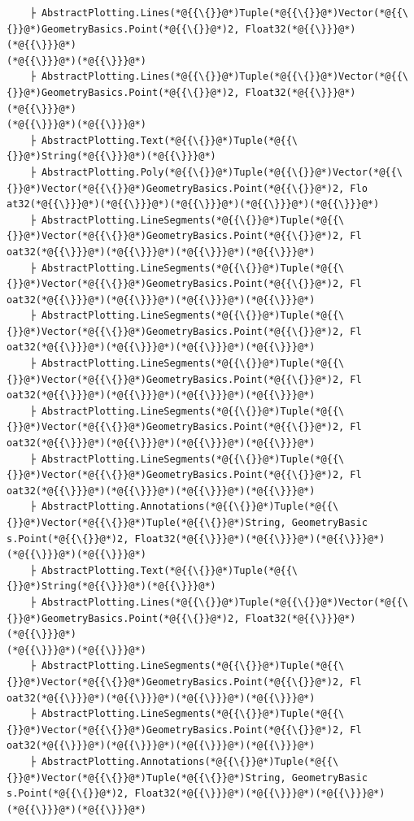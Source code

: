 \documentclass[12pt,a4paper]{article}
\begin{document}
\begin{lstlisting}
    ├ AbstractPlotting.Lines(*@{{\{}}@*)Tuple(*@{{\{}}@*)Vector(*@{{\{}}@*)GeometryBasics.Point(*@{{\{}}@*)2, Float32(*@{{\}}}@*)(*@{{\}}}@*)
(*@{{\}}}@*)(*@{{\}}}@*)
    ├ AbstractPlotting.Lines(*@{{\{}}@*)Tuple(*@{{\{}}@*)Vector(*@{{\{}}@*)GeometryBasics.Point(*@{{\{}}@*)2, Float32(*@{{\}}}@*)(*@{{\}}}@*)
(*@{{\}}}@*)(*@{{\}}}@*)
    ├ AbstractPlotting.Text(*@{{\{}}@*)Tuple(*@{{\{}}@*)String(*@{{\}}}@*)(*@{{\}}}@*)
    ├ AbstractPlotting.Poly(*@{{\{}}@*)Tuple(*@{{\{}}@*)Vector(*@{{\{}}@*)Vector(*@{{\{}}@*)GeometryBasics.Point(*@{{\{}}@*)2, Flo
at32(*@{{\}}}@*)(*@{{\}}}@*)(*@{{\}}}@*)(*@{{\}}}@*)(*@{{\}}}@*)
    ├ AbstractPlotting.LineSegments(*@{{\{}}@*)Tuple(*@{{\{}}@*)Vector(*@{{\{}}@*)GeometryBasics.Point(*@{{\{}}@*)2, Fl
oat32(*@{{\}}}@*)(*@{{\}}}@*)(*@{{\}}}@*)(*@{{\}}}@*)
    ├ AbstractPlotting.LineSegments(*@{{\{}}@*)Tuple(*@{{\{}}@*)Vector(*@{{\{}}@*)GeometryBasics.Point(*@{{\{}}@*)2, Fl
oat32(*@{{\}}}@*)(*@{{\}}}@*)(*@{{\}}}@*)(*@{{\}}}@*)
    ├ AbstractPlotting.LineSegments(*@{{\{}}@*)Tuple(*@{{\{}}@*)Vector(*@{{\{}}@*)GeometryBasics.Point(*@{{\{}}@*)2, Fl
oat32(*@{{\}}}@*)(*@{{\}}}@*)(*@{{\}}}@*)(*@{{\}}}@*)
    ├ AbstractPlotting.LineSegments(*@{{\{}}@*)Tuple(*@{{\{}}@*)Vector(*@{{\{}}@*)GeometryBasics.Point(*@{{\{}}@*)2, Fl
oat32(*@{{\}}}@*)(*@{{\}}}@*)(*@{{\}}}@*)(*@{{\}}}@*)
    ├ AbstractPlotting.LineSegments(*@{{\{}}@*)Tuple(*@{{\{}}@*)Vector(*@{{\{}}@*)GeometryBasics.Point(*@{{\{}}@*)2, Fl
oat32(*@{{\}}}@*)(*@{{\}}}@*)(*@{{\}}}@*)(*@{{\}}}@*)
    ├ AbstractPlotting.LineSegments(*@{{\{}}@*)Tuple(*@{{\{}}@*)Vector(*@{{\{}}@*)GeometryBasics.Point(*@{{\{}}@*)2, Fl
oat32(*@{{\}}}@*)(*@{{\}}}@*)(*@{{\}}}@*)(*@{{\}}}@*)
    ├ AbstractPlotting.Annotations(*@{{\{}}@*)Tuple(*@{{\{}}@*)Vector(*@{{\{}}@*)Tuple(*@{{\{}}@*)String, GeometryBasic
s.Point(*@{{\{}}@*)2, Float32(*@{{\}}}@*)(*@{{\}}}@*)(*@{{\}}}@*)(*@{{\}}}@*)(*@{{\}}}@*)
    ├ AbstractPlotting.Text(*@{{\{}}@*)Tuple(*@{{\{}}@*)String(*@{{\}}}@*)(*@{{\}}}@*)
    ├ AbstractPlotting.Lines(*@{{\{}}@*)Tuple(*@{{\{}}@*)Vector(*@{{\{}}@*)GeometryBasics.Point(*@{{\{}}@*)2, Float32(*@{{\}}}@*)(*@{{\}}}@*)
(*@{{\}}}@*)(*@{{\}}}@*)
    ├ AbstractPlotting.LineSegments(*@{{\{}}@*)Tuple(*@{{\{}}@*)Vector(*@{{\{}}@*)GeometryBasics.Point(*@{{\{}}@*)2, Fl
oat32(*@{{\}}}@*)(*@{{\}}}@*)(*@{{\}}}@*)(*@{{\}}}@*)
    ├ AbstractPlotting.LineSegments(*@{{\{}}@*)Tuple(*@{{\{}}@*)Vector(*@{{\{}}@*)GeometryBasics.Point(*@{{\{}}@*)2, Fl
oat32(*@{{\}}}@*)(*@{{\}}}@*)(*@{{\}}}@*)(*@{{\}}}@*)
    ├ AbstractPlotting.Annotations(*@{{\{}}@*)Tuple(*@{{\{}}@*)Vector(*@{{\{}}@*)Tuple(*@{{\{}}@*)String, GeometryBasic
s.Point(*@{{\{}}@*)2, Float32(*@{{\}}}@*)(*@{{\}}}@*)(*@{{\}}}@*)(*@{{\}}}@*)(*@{{\}}}@*)

\end{lstlisting}
\end{document}
